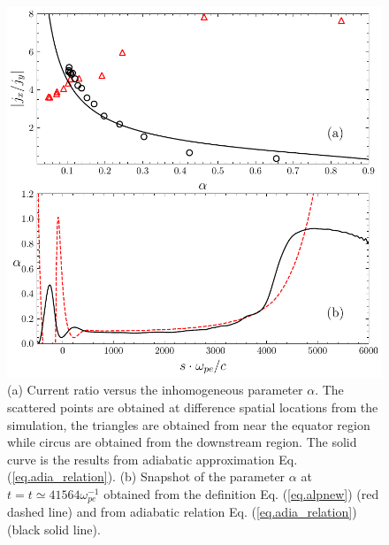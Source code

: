 \begin{figure}
    \centering
    \includegraphics[scale=0.5]{img/alpha.pdf}
    \caption{(a) Current ratio versus the inhomogeneous parameter $\alpha$. The scattered points are obtained at difference spatial locations from the simulation, the triangles are obtained from near the equator region while circus are obtained from the downstream region. 
    The solid curve is the results from adiabatic approximation Eq. (\ref{eq.adia_relation}). 
    (b) Snapshot  of the parameter $\alpha$ at $t = t\simeq41564\omega_{pe}^{-1}$ obtained  from the definition  Eq. (\ref{eq.alpnew}) (red dashed line) and  from adiabatic relation Eq. (\ref{eq.adia_relation}) (black solid line).
    }
    \label{fig.adiabatic}
\end{figure}


